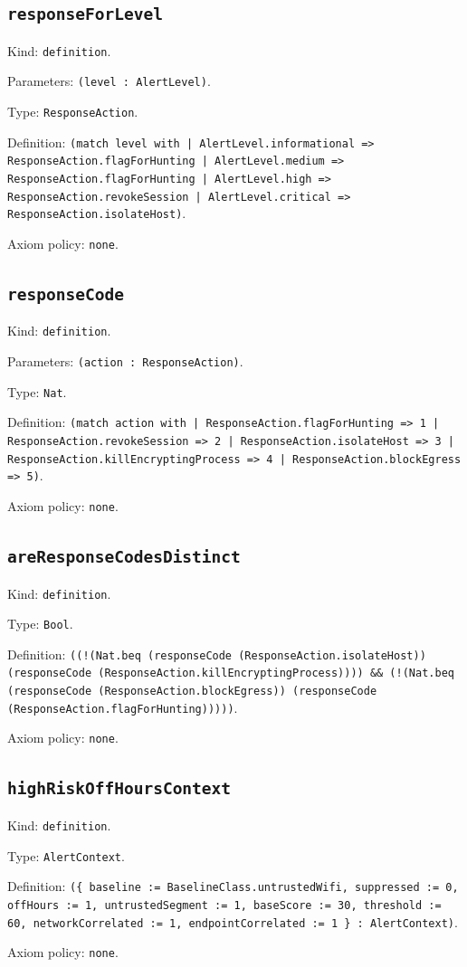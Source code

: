 \documentclass[11pt]{article}
\begin{document}
\subsection*{\texttt{responseForLevel}}
\noindent Kind: \texttt{definition}.\par
\noindent Parameters: \texttt{(level : AlertLevel)}.\par
\noindent Type: \texttt{ResponseAction}.\par
\noindent Definition: \texttt{(match level with | AlertLevel.informational => ResponseAction.flagForHunting | AlertLevel.medium => ResponseAction.flagForHunting | AlertLevel.high => ResponseAction.revokeSession | AlertLevel.critical => ResponseAction.isolateHost)}.\par
\noindent Axiom policy: \texttt{none}.\par
\subsection*{\texttt{responseCode}}
\noindent Kind: \texttt{definition}.\par
\noindent Parameters: \texttt{(action : ResponseAction)}.\par
\noindent Type: \texttt{Nat}.\par
\noindent Definition: \texttt{(match action with | ResponseAction.flagForHunting => 1 | ResponseAction.revokeSession => 2 | ResponseAction.isolateHost => 3 | ResponseAction.killEncryptingProcess => 4 | ResponseAction.blockEgress => 5)}.\par
\noindent Axiom policy: \texttt{none}.\par
\subsection*{\texttt{areResponseCodesDistinct}}
\noindent Kind: \texttt{definition}.\par
\noindent Type: \texttt{Bool}.\par
\noindent Definition: \texttt{((!(Nat.beq (responseCode (ResponseAction.isolateHost)) (responseCode (ResponseAction.killEncryptingProcess)))) \&\& (!(Nat.beq (responseCode (ResponseAction.blockEgress)) (responseCode (ResponseAction.flagForHunting)))))}.\par
\noindent Axiom policy: \texttt{none}.\par
\subsection*{\texttt{highRiskOffHoursContext}}
\noindent Kind: \texttt{definition}.\par
\noindent Type: \texttt{AlertContext}.\par
\noindent Definition: \texttt{(\{ baseline := BaselineClass.untrustedWifi, suppressed := 0, offHours := 1, untrustedSegment := 1, baseScore := 30, threshold := 60, networkCorrelated := 1, endpointCorrelated := 1 \} : AlertContext)}.\par
\noindent Axiom policy: \texttt{none}.\par
\end{document}
